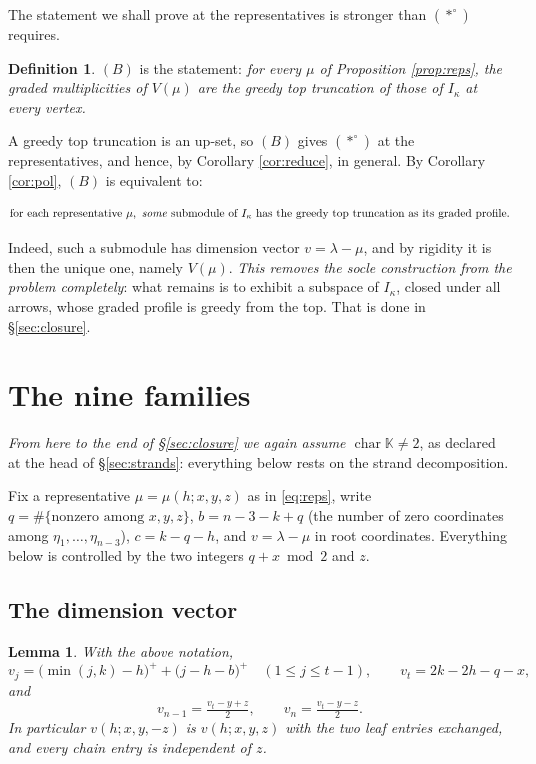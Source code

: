 \documentclass[reqno]{amsart}
\theoremstyle{plain}
\newtheorem{lemma}[theorem]{Lemma}
\theoremstyle{definition}
\newtheorem{definition}[theorem]{Definition}
\newcommand{\la}{\lambda}
\newcommand{\ka}{\kappa}
\begin{document}
The statement we shall prove at the representatives is stronger than
$(*^\circ)$ requires.

\begin{definition}\label{def:B}
$(B)$ is the statement: \emph{for every $\mu$ of Proposition \ref{prop:reps},
the graded multiplicities of $V(\mu)$ are the greedy top truncation of those of
$I_\ka$ at every vertex.}
\end{definition}

A greedy top truncation is an up-set, so $(B)$ gives $(*^\circ)$ at the
representatives, and hence, by Corollary \ref{cor:reduce}, in general.  By
Corollary \ref{cor:pol}, $(B)$ is equivalent to:

\begin{equation}\label{eq:Brig}
   \text{for each representative } \mu, \text{ \emph{some} submodule of }
   I_\ka \text{ has the greedy top truncation as its graded profile.}
\end{equation}

Indeed, such a submodule has dimension vector $v=\la-\mu$, and by rigidity it
is then the unique one, namely $V(\mu)$.  \emph{This removes the socle
construction from the problem completely}: what remains is to exhibit a
subspace of $I_\ka$, closed under all arrows, whose graded profile is greedy
from the top.  That is done in \S\ref{sec:closure}.

\section{The nine families}\label{sec:families}

\emph{From here to the end of \S\ref{sec:closure} we again assume
$\operatorname{char}\mathbb{K}\ne2$}, as declared at the head of
\S\ref{sec:strands}: everything below rests on the strand decomposition.

Fix a representative $\mu=\mu(h;x,y,z)$ as in \eqref{eq:reps}, write
$q=\#\{\text{nonzero among }x,y,z\}$, $b=n-3-k+q$ (the number of zero
coordinates among $\eta_1,\dots,\eta_{n-3}$), $c=k-q-h$, and $v=\la-\mu$ in
root coordinates.  Everything below is controlled by the two integers
$q+x\bmod2$ and $z$.

\subsection{The dimension vector}

\begin{lemma}\label{lem:vclosed}
With the above notation,
\begin{equation}\label{eq:vclosed}
   v_j=\bigl(\min(j,k)-h\bigr)^{+}+\bigl(j-h-b\bigr)^{+}
   \quad (1\le j\le t-1),
   \qquad
   v_t=2k-2h-q-x,
\end{equation}
and
\begin{equation}\label{eq:vleaf}
   v_{n-1}=\tfrac{v_t-y+z}{2},\qquad v_n=\tfrac{v_t-y-z}{2} .
\end{equation}
In particular $v(h;x,y,-z)$ is $v(h;x,y,z)$ with the two leaf entries
exchanged, and every chain entry is independent of $z$.
\end{lemma}
\end{document}
